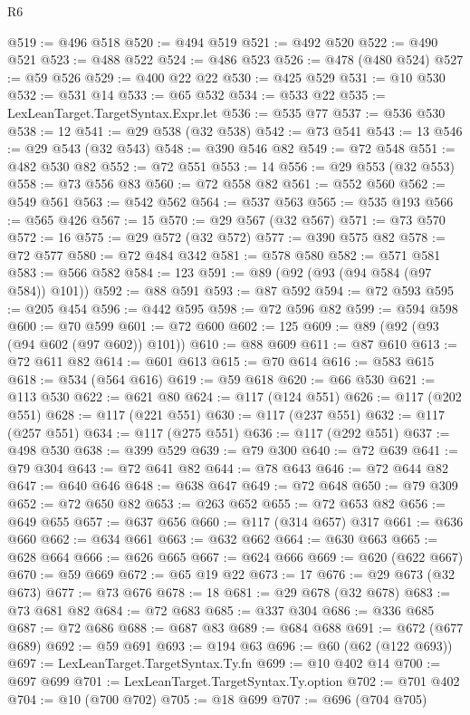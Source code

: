 \begin{lexlean}{R6}
\begin{coremodule}
@519 := @496 @518
@520 := @494 @519
@521 := @492 @520
@522 := @490 @521
@523 := @488 @522
@524 := @486 @523
@526 := @478 (@480 @524)
@527 := @59 @526
@529 := @400 @22 @22
@530 := @425 @529
@531 := @10 @530
@532 := @531 @14
@533 := @65 @532
@534 := @533 @22
@535 := LexLeanTarget.TargetSyntax.Expr.let
@536 := @535 @77
@537 := @536 @530
@538 := 12
@541 := @29 @538 (@32 @538)
@542 := @73 @541
@543 := 13
@546 := @29 @543 (@32 @543)
@548 := @390 @546 @82
@549 := @72 @548
@551 := @482 @530 @82
@552 := @72 @551
@553 := 14
@556 := @29 @553 (@32 @553)
@558 := @73 @556 @83
@560 := @72 @558 @82
@561 := @552 @560
@562 := @549 @561
@563 := @542 @562
@564 := @537 @563
@565 := @535 @193
@566 := @565 @426
@567 := 15
@570 := @29 @567 (@32 @567)
@571 := @73 @570
@572 := 16
@575 := @29 @572 (@32 @572)
@577 := @390 @575 @82
@578 := @72 @577
@580 := @72 @484 @342
@581 := @578 @580
@582 := @571 @581
@583 := @566 @582
@584 := 123
@591 := @89 (@92 (@93 (@94 @584 (@97 @584)) @101))
@592 := @88 @591
@593 := @87 @592
@594 := @72 @593
@595 := @205 @454
@596 := @442 @595
@598 := @72 @596 @82
@599 := @594 @598
@600 := @70 @599
@601 := @72 @600
@602 := 125
@609 := @89 (@92 (@93 (@94 @602 (@97 @602)) @101))
@610 := @88 @609
@611 := @87 @610
@613 := @72 @611 @82
@614 := @601 @613
@615 := @70 @614
@616 := @583 @615
@618 := @534 (@564 @616)
@619 := @59 @618
@620 := @66 @530
@621 := @113 @530
@622 := @621 @80
@624 := @117 (@124 @551)
@626 := @117 (@202 @551)
@628 := @117 (@221 @551)
@630 := @117 (@237 @551)
@632 := @117 (@257 @551)
@634 := @117 (@275 @551)
@636 := @117 (@292 @551)
@637 := @498 @530
@638 := @399 @529
@639 := @79 @300
@640 := @72 @639
@641 := @79 @304
@643 := @72 @641 @82
@644 := @78 @643
@646 := @72 @644 @82
@647 := @640 @646
@648 := @638 @647
@649 := @72 @648
@650 := @79 @309
@652 := @72 @650 @82
@653 := @263 @652
@655 := @72 @653 @82
@656 := @649 @655
@657 := @637 @656
@660 := @117 (@314 @657) @317
@661 := @636 @660
@662 := @634 @661
@663 := @632 @662
@664 := @630 @663
@665 := @628 @664
@666 := @626 @665
@667 := @624 @666
@669 := @620 (@622 @667)
@670 := @59 @669
@672 := @65 @19 @22
@673 := 17
@676 := @29 @673 (@32 @673)
@677 := @73 @676
@678 := 18
@681 := @29 @678 (@32 @678)
@683 := @73 @681 @82
@684 := @72 @683
@685 := @337 @304
@686 := @336 @685
@687 := @72 @686
@688 := @687 @83
@689 := @684 @688
@691 := @672 (@677 @689)
@692 := @59 @691
@693 := @194 @63
@696 := @60 (@62 (@122 @693))
@697 := LexLeanTarget.TargetSyntax.Ty.fn
@699 := @10 @402 @14
@700 := @697 @699
@701 := LexLeanTarget.TargetSyntax.Ty.option
@702 := @701 @402
@704 := @10 (@700 @702)
@705 := @18 @699
@707 := @696 (@704 @705)

\end{coremodule}
\end{lexlean}
